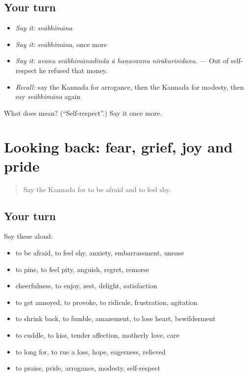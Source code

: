 \subsection*{Your turn}
\begin{itemize}
\raggedright
  \item \emph{Say it:} \emph{svābhimāna}
  \item \emph{Say it:} \emph{svābhimāna}, once more
  \item \emph{Say it:} \emph{avanu svābhimānadinda ā haṇavannu nirākarisidanu.} — Out of self-respect he refused that money.
  \item \emph{Recall:} say the Kannada for arrogance, then the Kannada for modesty, then say \emph{svābhimāna} again
\end{itemize}

\begin{tcolorbox}[breakable,colback=teal!4,colframe=teal!35!black,title={Before you move on}]
What does  mean? (\textquotedblleft{}Self-respect\textquotedblright{}.) Say it once more.
\end{tcolorbox}
\section[(dialogue)]{Looking back: fear, grief, joy and pride}

\label{lesson:KA-R497-review-490-497}



\begin{quote}
Say the Kannada for to be afraid and to feel shy.
\end{quote}

\subsection*{Your turn}
Say these aloud:

\begin{itemize}
\raggedright
  \item to be afraid, to feel shy, anxiety, embarrassment, unease
  \item to pine, to feel pity, anguish, regret, remorse
  \item cheerfulness, to enjoy, zest, delight, satisfaction
  \item to get annoyed, to provoke, to ridicule, frustration, agitation
  \item to shrink back, to fumble, amazement, to lose heart, bewilderment
  \item to cuddle, to kiss, tender affection, motherly love, care
  \item to long for, to rue a loss, hope, eagerness, relieved
  \item to praise, pride, arrogance, modesty, self-respect
\end{itemize}

